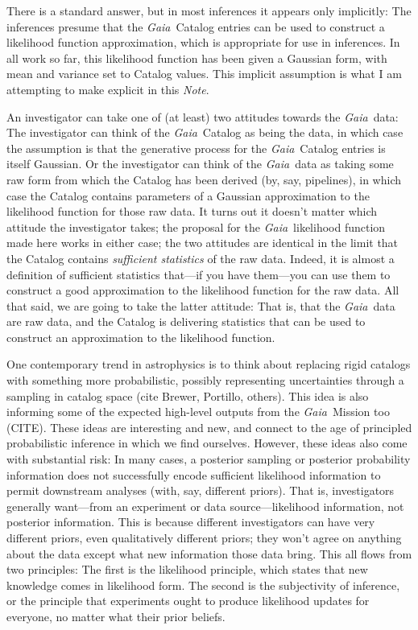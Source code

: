 \documentclass[12pt]{article}
\newcommand{\Gaia}{\textsl{Gaia}}
\newcommand{\documentname}{\textsl{Note}}
\begin{document}
There is a standard answer, but in most inferences it appears only implicitly:
The inferences presume that the \Gaia\ Catalog entries can be used to construct
a likelihood function approximation, which is appropriate for use in inferences.
In all work so far, this likelihood function has been given a Gaussian form,
with mean and variance set to Catalog values.
This implicit assumption is what I am attempting to make explicit in this \documentname.

An investigator can take one of (at least) two attitudes towards the \Gaia\ data:
The investigator can think of the \Gaia\ Catalog as being the data, in which case
the assumption is that the generative process for the \Gaia\ Catalog entries is
itself Gaussian.
Or the investigator can think of the \Gaia\ data as taking some raw form
from which the Catalog has been derived (by, say, pipelines),
in which case the Catalog contains parameters of a Gaussian
approximation to the likelihood function for those raw data.
It turns out it doesn't matter which attitude the investigator takes; the
proposal for the \Gaia\ likelihood function made here works in either case;
the two attitudes are identical in the limit that the Catalog contains
\emph{sufficient statistics} of the raw data.
Indeed, it is almost a definition of sufficient statistics that---if you have them---you
can use them to construct a good approximation to the likelihood function for the
raw data.
All that said, we are going to take the latter attitude: That is, that the
\Gaia\ data are raw data, and the Catalog is delivering statistics that can
be used to construct an approximation to the likelihood function.

One contemporary trend in astrophysics is to think about replacing rigid
catalogs with something more probabilistic, possibly representing uncertainties
through a sampling in catalog space (cite Brewer, Portillo, others).
This idea is also informing some of the expected high-level outputs from
the \Gaia\ Mission too (CITE).
These ideas are interesting and new, and connect to the age of principled
probabilistic inference in which we find ourselves.
However, these ideas also come with substantial risk:
In many cases, a posterior sampling or posterior probability information
does not successfully encode sufficient likelihood information to permit
downstream analyses (with, say, different priors).
That is, investigators generally want---from an experiment or data source---likelihood
information, not posterior information.
This is because different investigators can have very different priors,
even qualitatively different priors; they won't agree on anything about the
data except what new information those data bring.
This all flows from two principles: The first is the likelihood principle,
which states that new knowledge comes in likelihood form.
The second is the subjectivity of inference, or the principle that
experiments ought to produce likelihood updates for everyone, no matter
what their prior beliefs.
\end{document}
